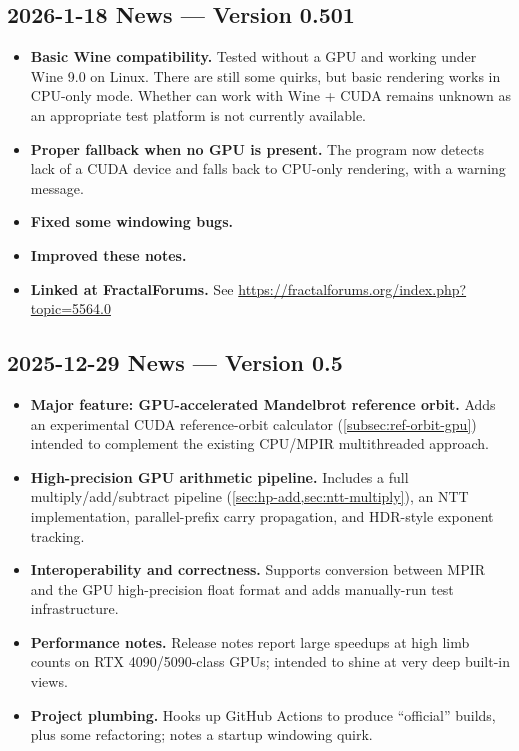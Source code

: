 \subsection{2026-1-18 News --- Version 0.501}

\begin{itemize}
\item \textbf{Basic Wine compatibility.}  Tested without a GPU and working under
Wine 9.0 on Linux.   There are still some quirks, but basic rendering works in
CPU-only mode. Whether \FractalShark{} can work with Wine + CUDA remains unknown as
an appropriate test platform is not currently available.
\item \textbf{Proper fallback when no GPU is present.}  The program now detects lack of a CUDA
device and falls back to CPU-only rendering, with a warning message.
\item \textbf{Fixed some windowing bugs.}
\item \textbf{Improved these notes.}
\item \textbf{Linked at FractalForums.}  See \url{https://fractalforums.org/index.php?topic=5564.0}
\end{itemize}

\subsection{2025-12-29 News --- Version 0.5}
\begin{itemize}
  \item \textbf{Major feature: GPU-accelerated Mandelbrot reference orbit.} Adds
  an experimental CUDA reference-orbit calculator (\cref{subsec:ref-orbit-gpu}) intended to complement the
  existing CPU/MPIR multithreaded approach.

  \item \textbf{High-precision GPU arithmetic pipeline.}
  Includes a full multiply/add/subtract pipeline
  (\cref{sec:hp-add,sec:ntt-multiply}), an NTT
  implementation, parallel-prefix carry propagation, and
  HDR-style exponent tracking.

  \item \textbf{Interoperability and correctness.} Supports conversion between
  MPIR and the GPU high-precision float format and adds manually-run test
  infrastructure.

  \item \textbf{Performance notes.} Release notes report large speedups at high
  limb counts on RTX 4090/5090-class GPUs; intended to shine at very deep
  built-in views.

  \item \textbf{Project plumbing.} Hooks up GitHub Actions to produce “official”
  builds, plus some refactoring; notes a startup windowing quirk.
\end{itemize}

